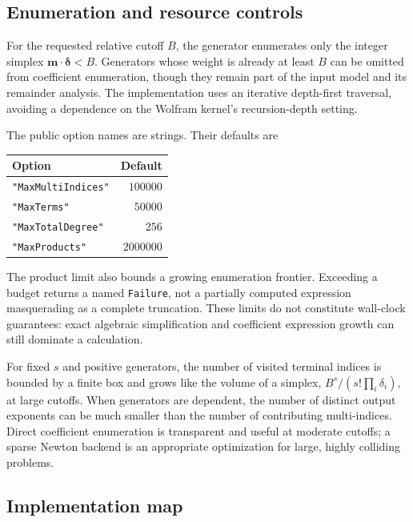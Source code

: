 \documentclass[11pt,a4paper]{article}
\numberwithin{equation}{section}
\theoremstyle{definition}
\theoremstyle{remark}
\newcommand{\code}[1]{\texttt{#1}}
\begin{document}
\subsection{Enumeration and resource controls}

For the requested relative cutoff $B$, the generator enumerates only the
integer simplex $\boldsymbol m\cdot\boldsymbol\delta<B$. Generators whose
weight is already at least $B$ can be omitted from coefficient enumeration,
though they remain part of the input model and its remainder analysis.
The implementation uses an iterative depth-first traversal, avoiding a
dependence on the Wolfram kernel's recursion-depth setting.

The public option names are strings. Their defaults are
\begin{center}
\begin{tabular}{@{}lr@{}}
\toprule
Option & Default\\
\midrule
\code{"MaxMultiIndices"} & $100000$\\
\code{"MaxTerms"} & $50000$\\
\code{"MaxTotalDegree"} & $256$\\
\code{"MaxProducts"} & $2000000$\\
\bottomrule
\end{tabular}
\end{center}
The product limit also bounds a growing enumeration frontier. Exceeding a
budget returns a named \code{Failure}, not a partially computed expression
masquerading as a complete truncation. These limits do not constitute
wall-clock guarantees: exact algebraic simplification and coefficient
expression growth can still dominate a calculation.

For fixed $s$ and positive generators, the number of visited terminal
indices is bounded by a finite box and grows like the volume of a simplex,
$B^s/(s!\prod_i\delta_i)$, at large cutoffs. When generators are dependent,
the number of distinct output exponents can be much smaller than the
number of contributing multi-indices. Direct coefficient enumeration is
transparent and useful at moderate cutoffs; a sparse Newton backend is
an appropriate optimization for large, highly colliding problems.

\subsection{Implementation map}
\end{document}
